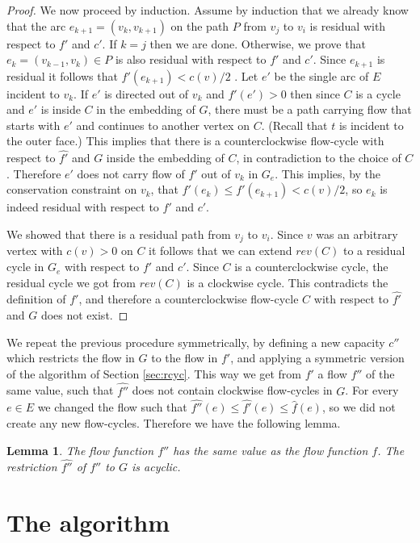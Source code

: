 \documentclass[a4paper,11pt]{article}
\newtheorem{lemma}[theorem]{Lemma}
\begin{document}
\begin{proof}
We now proceed by induction. Assume by induction that we already
know that the arc $e_{k+1} = (v_k, v_{k+1})$ on the path $P$
from $v_j$ to $v_i$ is residual with respect to $f'$ and $c'$.
If $k = j$ then we are done. Otherwise, we
prove that $e_k = (v_{k-1}, v_k) \in P$ is also
residual with respect to $f'$ and $c'$. Since  $e_{k+1}$ is
residual it follows that
 $f'(e_{k+1}) < c(v)/2$ .
Let $e'$ be the single arc of $E$ incident to $v_k$. If $e'$ is
directed out of $v_k$ and $f'(e') > 0$ then since $C$ is a cycle and
$e'$ is inside $C$ in the embedding of $G$, there must be a path
carrying flow that starts with $e'$ and continues to another vertex
on $C$. (Recall that $t$ is incident to the outer face.) This
implies that there is a counterclockwise flow-cycle with respect to
$\hat{f'}$ and $G$ inside the embedding of $C$, in contradiction to
the choice of $C$. Therefore $e'$ does not carry flow of $f'$ out of
$v_k$ in $G_e$. This implies, by the conservation constraint on $v_k$,
that $f'(e_k) \leq f'(e_{k+1})< c(v) /2$,
 so $e_k$ is indeed residual
with respect to $f'$ and $c'$.

We showed that there is a residual path from $v_j$ to $v_i$.
Since $v$ was an arbitrary vertex with $c(v) > 0$ on $C$ it follows that
we can extend $rev(C)$ to a residual cycle in $G_e$ with respect to $f'$ and
$c'$. Since $C$ is a counterclockwise cycle, the residual cycle we got from
$rev(C)$ is a clockwise cycle.
This contradicts the definition of $f'$, and therefore a counterclockwise
flow-cycle $C$ with respect to $\hat{f'}$ and $G$ does not exist.
\end{proof}

We repeat the previous procedure symmetrically, by defining a new capacity
$c''$ which restricts the flow in $G$ to the flow in $f'$, and applying a
symmetric version of the algorithm of Section \ref{sec:rcyc}. This way we
get from $f'$ a flow $f''$ of the same value, such that $\hat{f''}$
does not contain clockwise flow-cycles in $G$. For
every $e \in E$ we changed the flow such that $\hat{f''}(e) \leq
\hat{f'}(e) \leq \hat{f}(e)$, so we did not create any new flow-cycles.
Therefore we have the following lemma.
\begin{lemma} \label{lem:fpp}
The flow function $f''$ has the same value as the flow function $f$. The restriction
$\hat{f''}$ of $f''$ to $G$ is acyclic.
\end{lemma}

\section{The algorithm}
\end{document}

